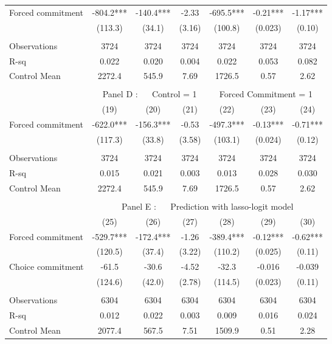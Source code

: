 \begin{tabular}{lcccccc}
\midrule
\midrule
Forced commitment  & -804.2*** & -140.4*** & -2.33 & -695.5*** & -0.21*** & -1.17*** \\
      & (113.3) & (34.1) & (3.16) & (100.8) & (0.023) & (0.10) \\
      &       &       &       &       &       &  \\
\midrule
Observations & 3724  & 3724  & 3724  & 3724  & 3724  & 3724 \\
R-sq  & 0.022 & 0.020 & 0.004 & 0.022 & 0.053 & 0.082 \\
Control Mean & 2272.4 & 545.9 & 7.69  & 1726.5 & 0.57  & 2.62 \\
\midrule
\midrule
      &       &       &       &       &       &  \\
\midrule
      & \multicolumn{6}{c}{Panel D : $\quad$ Control  = 1       $\quad\quad$                      Forced Commitment = 1} \\
\midrule
\midrule
      & (19)  & (20)  & (21)  & (22)  & (23)  & (24) \\
\midrule
\midrule
Forced commitment  & -622.0*** & -156.3*** & -0.53 & -497.3*** & -0.13*** & -0.71*** \\
      & (117.3) & (33.8) & (3.58) & (103.1) & (0.024) & (0.12) \\
      &       &       &       &       &       &  \\
\midrule
Observations & 3724  & 3724  & 3724  & 3724  & 3724  & 3724 \\
R-sq  & 0.015 & 0.021 & 0.003 & 0.013 & 0.028 & 0.030 \\
Control Mean & 2272.4 & 545.9 & 7.69  & 1726.5 & 0.57  & 2.62 \\
\midrule
\midrule
      &       &       &       &       &       &  \\
\midrule
      & \multicolumn{6}{c}{Panel E : $\quad$ Prediction with lasso-logit model} \\
\midrule
\midrule
      & (25)  & (26)  & (27)  & (28)  & (29)  & (30) \\
\midrule
\midrule
Forced commitment  & -529.7*** & -172.4*** & -1.26 & -389.4*** & -0.12*** & -0.62*** \\
      & (120.5) & (37.4) & (3.22) & (110.2) & (0.025) & (0.11) \\
Choice commitment & -61.5 & -30.6 & -4.52 & -32.3 & -0.016 & -0.039 \\
      & (124.6) & (42.0) & (2.78) & (114.5) & (0.023) & (0.11) \\
      &       &       &       &       &       &  \\
\midrule
Observations & 6304  & 6304  & 6304  & 6304  & 6304  & 6304 \\
R-sq  & 0.012 & 0.022 & 0.003 & 0.009 & 0.016 & 0.024 \\
Control Mean & 2077.4 & 567.5 & 7.51  & 1509.9 & 0.51  & 2.28 \\
\bottomrule
\bottomrule
\end{tabular}%
